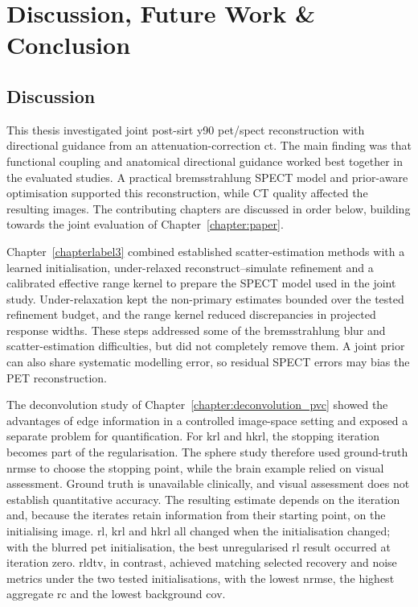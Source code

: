 \chapter{Discussion, Future Work \& Conclusion}
\label{discussion}

\section{Discussion}

This thesis investigated joint post-\gls{sirt} \gls{y90} \gls{pet}/\gls{spect} reconstruction with directional guidance from an attenuation-correction \gls{ct}. The main finding was that functional coupling and anatomical directional guidance worked best together in the evaluated studies. A practical bremsstrahlung SPECT model and prior-aware optimisation supported this reconstruction, while CT quality affected the resulting images. The contributing chapters are discussed in order below, building towards the joint evaluation of Chapter~\ref{chapter:paper}.

Chapter~\ref{chapterlabel3} combined established scatter-estimation methods with a learned initialisation, under-relaxed reconstruct--simulate refinement and a calibrated effective range kernel to prepare the SPECT model used in the joint study. Under-relaxation kept the non-primary estimates bounded over the tested refinement budget, and the range kernel reduced discrepancies in projected response widths. These steps addressed some of the bremsstrahlung blur and scatter-estimation difficulties, but did not completely remove them. A joint prior can also share systematic modelling error, so residual SPECT errors may bias the PET reconstruction.

The deconvolution study of Chapter~\ref{chapter:deconvolution_pvc} showed the advantages of edge information in a controlled image-space setting and exposed a separate problem for quantification. For \gls{krl} and \gls{hkrl}, the stopping iteration becomes part of the regularisation. The sphere study therefore used ground-truth \gls{nrmse} to choose the stopping point, while the brain example relied on visual assessment. Ground truth is unavailable clinically, and visual assessment does not establish quantitative accuracy. The resulting estimate depends on the iteration and, because the iterates retain information from their starting point, on the initialising image. \gls{rl}, \gls{krl} and \gls{hkrl} all changed when the initialisation changed; with the blurred \gls{pet} initialisation, the best unregularised \gls{rl} result occurred at iteration zero. \gls{rldtv}, in contrast, achieved matching selected recovery and noise metrics under the two tested initialisations, with the lowest \gls{nrmse}, the highest aggregate \gls{rc} and the lowest background \gls{cov}.

